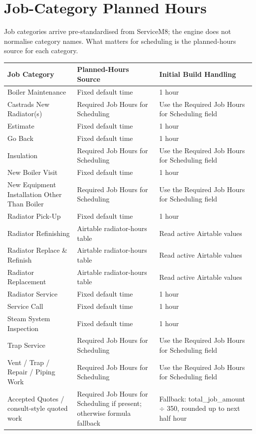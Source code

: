 \documentclass[12pt]{article}
\begin{document}
\section*{Job-Category Planned Hours}
\label{sec:categories}

Job categories arrive pre-standardised from ServiceM8; the engine does not normalise category names.
What matters for scheduling is the planned-hours source for each category.

\medskip
{\small
\begin{longtable}{lp{4cm}p{4.5cm}}
\toprule
\textbf{Job Category} & \textbf{Planned-Hours Source} & \textbf{Initial Build Handling} \\
\midrule
Boiler Maintenance                & Fixed default time  & 1 hour \\
Castrads New Radiator(s)          & Required Job Hours for Scheduling  & Use the Required Job Hours for Scheduling field \\
Estimate                          & Fixed default time  & 1 hour \\
Go Back                           & Fixed default time  & 1 hour \\
Insulation                        & Required Job Hours for Scheduling  & Use the Required Job Hours for Scheduling field \\
New Boiler Visit                  & Fixed default time  & 1 hour \\
New Equipment Installation Other Than Boiler & Required Job Hours for Scheduling & Use the Required Job Hours for Scheduling field \\
Radiator Pick-Up                  & Fixed default time  & 1 hour \\
Radiator Refinishing              & Airtable radiator-hours table & Read active Airtable values \\
Radiator Replace \& Refinish     & Airtable radiator-hours table & Read active Airtable values \\
Radiator Replacement              & Airtable radiator-hours table & Read active Airtable values \\
Radiator Service                  & Fixed default time  & 1 hour \\
Service Call                      & Fixed default time  & 1 hour \\
Steam System Inspection           & Fixed default time  & 1 hour \\
Trap Service                      & Required Job Hours for Scheduling  & Use the Required Job Hours for Scheduling field \\
Vent / Trap / Repair / Piping Work & Required Job Hours for Scheduling  & Use the Required Job Hours for Scheduling field \\
Accepted Quotes / consult-style quoted work & Required Job Hours for Scheduling if present; otherwise formula fallback & Fallback: total\_job\_amount $\div$ 350, rounded up to next half hour \\
\bottomrule
\end{longtable}
}
\end{document}
